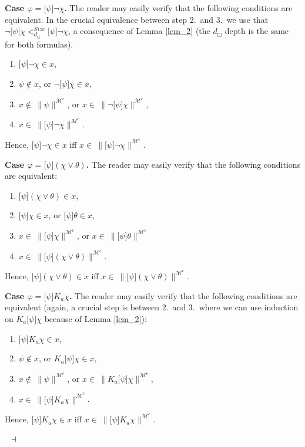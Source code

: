 \documentclass{article}[12pt]
\newenvironment{proof}{\noindent {\bf Proof \ }}{\hfill ~$\dashv$}
\renewcommand{\phi}{\varphi}
\begin{document}
\begin{proof}
\medskip \noindent 
{\bf Case $\phi=\lbrack\psi\rbrack\neg\chi$.}
The reader may easily verify that the following conditions are equivalent. In the crucial equivalence between step 2.\ and 3.\ we use that $\neg\lbrack\psi\rbrack\chi <^{Size}_{d_\Box} \lbrack\psi\rbrack\neg\chi$, a consequence of Lemma \ref{lem_2} (the $d_\Box$ depth is the same for both formulas). 
\begin{enumerate}
\item $\lbrack\psi\rbrack\neg\chi\in x$,
\item $\psi\not\in x$, or $\neg\lbrack\psi\rbrack\chi\in x$,
\item $x\not\in \ \parallel\psi\parallel^{\mathcal{M}^{c}}$, or $x\in \ \parallel\neg\lbrack\psi\rbrack\chi\parallel^{\mathcal{M}^{c}}$,
\item $x\in \ \parallel\lbrack\psi\rbrack\neg\chi\parallel^{\mathcal{M}^{c}}$.
\end{enumerate}
Hence, $\lbrack\psi\rbrack\neg\chi\in x$ iff $x\in \ \parallel\lbrack\psi\rbrack\neg\chi\parallel^{\mathcal{M}^{c}}$.


\medskip \noindent 
{\bf Case $\phi=\lbrack\psi\rbrack(\chi\vee\theta)$.}
The reader may easily verify that the following conditions are equivalent:
\begin{enumerate}
\item $\lbrack\psi\rbrack(\chi\vee\theta)\in x$,
\item $\lbrack\psi\rbrack\chi\in x$, or $\lbrack\psi\rbrack\theta\in x$,
\item $x\in \ \parallel\lbrack\psi\rbrack\chi\parallel^{\mathcal{M}^{c}}$, or $x\in \ \parallel\lbrack\psi\rbrack\theta\parallel^{\mathcal{M}^{c}}$
\item $x\in \ \parallel\lbrack\psi\rbrack(\chi\vee\theta)\parallel^{\mathcal{M}^{c}}$.
\end{enumerate}
Hence, $\lbrack\psi\rbrack(\chi\vee\theta)\in x$ iff $x\in \ \parallel\lbrack\psi\rbrack(\chi\vee\theta)\parallel^{\mathcal{M}^{c}}$.


\medskip \noindent 
{\bf Case $\phi=\lbrack\psi\rbrack K_{a}\chi$.}
The reader may easily verify that the following conditions are equivalent (again, a crucial step is between 2.\ and 3.\, where we can use induction on $K_{a}\lbrack\psi\rbrack\chi$ because of Lemma \ref{lem_2}): 
\begin{enumerate}
\item $\lbrack\psi\rbrack K_{a}\chi\in x$,
\item $\psi\not\in x$, or $K_{a}\lbrack\psi\rbrack\chi\in x$,
\item $x\not\in \ \parallel\psi\parallel^{\mathcal{M}^{c}}$, or $x\in \ \parallel K_{a}\lbrack\psi\rbrack\chi\parallel^{\mathcal{M}^{c}}$,
\item $x\in \ \parallel\lbrack\psi\rbrack K_{a}\chi\parallel^{\mathcal{M}^{c}}$.
\end{enumerate}
Hence, $\lbrack\psi\rbrack K_{a}\chi\in x$ iff $x\in \ \parallel\lbrack\psi\rbrack K_{a}\chi\parallel^{\mathcal{M}^{c}}$.



\end{proof}
\end{document}

